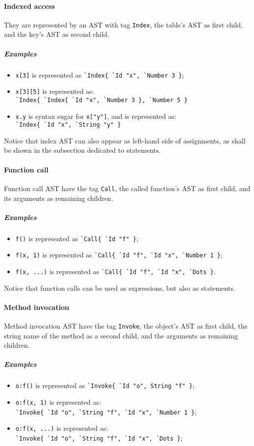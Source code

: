 \paragraph{Indexed access}
They are represented by an AST with tag \verb+Index+, the table's AST
as first child, and the key's AST as second child.

\subparagraph{Examples}
\begin{itemize}
\item \verb+x[3]+ is represented as \verb+`Index{ `Id "x", `Number 3 }+;
\item \verb+x[3][5]+ is represented as:\\
  \verb+`Index{ `Index{ `Id "x", `Number 3 }, `Number 5 }+
\item \verb+x.y+ is syntax sugar for \verb+x["y"]+, and is represented as:\\
  \verb+`Index{ `Id "x", `String "y" }+
\end{itemize}

Notice that index AST can also appear as left-hand side of
assignments, as shall be shown in the subsection dedicated to
statements.

\paragraph{Function call}
Function call AST have the tag \verb+Call+, the called function's AST
as first child, and its arguments as remaining children.

\subparagraph{Examples}
\begin{itemize}
\item \verb+f()+ is represented as \verb+`Call{ `Id "f" }+;
\item \verb+f(x, 1)+ is represented as
  \verb+`Call{ `Id "f", `Id "x", `Number 1 }+;
\item \verb+f(x, ...)+ is represented as
  \verb+`Call{ `Id "f", `Id "x", `Dots }+.
\end{itemize}

Notice that function calls can be used as expressions, but also as statements. 

\paragraph{Method invocation}
Method invocation AST have the tag \verb+Invoke+, the object's AST as
first child, the string name of the method as a second child, and
the arguments as remaining children.

\subparagraph{Examples}
\begin{itemize}
\item \verb+o:f()+ is represented as \verb+`Invoke{ `Id "o", String "f" }+;
\item \verb+o:f(x, 1)+ is represented as:\\
  \verb+`Invoke{ `Id "o", `String "f", `Id "x", `Number 1 }+;
\item \verb+o:f(x, ...)+ is represented as:\\
  \verb+`Invoke{ `Id "o", `String "f", `Id "x", `Dots }+;
\end{itemize}

